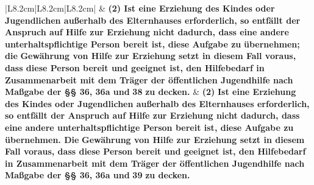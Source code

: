 \documentclass[10pt,a4paper,landscape]{article}
\begin{document}
\begin{longtable}{|L{8.2cm}|L{8.2cm}|L{8.2cm}|}
 & \textbf{(2) Ist eine Erziehung des Kindes oder  \newline Jugendlichen außerhalb des  \newline Elternhauses erforderlich, so entfällt der  \newline Anspruch auf Hilfe zur Erziehung nicht  \newline dadurch, dass eine andere  \newline unterhaltspflichtige Person bereit ist,  \newline diese Aufgabe zu }\textbf{\textcolor{diffred}{übernehmen; die}}\textbf{  \newline Gewährung von Hilfe zur Erziehung  \newline setzt in diesem Fall voraus, dass diese  \newline Person bereit und geeignet ist, den  \newline Hilfebedarf in Zusammenarbeit mit dem  \newline Träger der öffentlichen Jugendhilfe  \newline nach Maßgabe der \S{}\S{} 36, 36a und }\textbf{\textcolor{diffred}{38}}\textbf{ zu  \newline decken. } & \textbf{(2)} \textbf{Ist eine Erziehung des Kindes oder  \newline Jugendlichen außerhalb des  \newline Elternhauses erforderlich, so entfällt der  \newline Anspruch auf Hilfe zur Erziehung nicht  \newline dadurch, dass eine andere  \newline unterhaltspflichtige Person bereit ist,  \newline diese Aufgabe zu }\textbf{\textcolor{diffgreen}{übernehmen. Die}}\textbf{  \newline Gewährung von Hilfe zur Erziehung  \newline setzt in diesem Fall voraus, dass diese  \newline Person bereit und geeignet ist, den  \newline Hilfebedarf in Zusammenarbeit mit dem  \newline Träger der öffentlichen Jugendhilfe  \newline nach Maßgabe der \S{}\S{} 36, 36a und }\textbf{\textcolor{diffgreen}{39}}\textbf{ zu  \newline decken.  } \\
\hhline{|---|}

\end{longtable}
\end{document}
